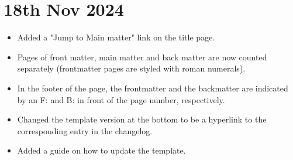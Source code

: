 \section*{18th Nov 2024} \label{sec:changelog:2024/11/18}
\begin{itemize}
    \item Added a "Jump to Main matter" link on the title page.
    \item Pages of front matter, main matter and back matter are now counted separately (frontmatter pages are styled with roman numerals).
    \item In the footer of the page, the frontmatter and the backmatter are indicated by an F: and B: in front of the page number, respectively.
    \item Changed the template version at the bottom to be a hyperlink to the corresponding entry in the changelog.
    \item Added a guide on how to update the template.
\end{itemize}